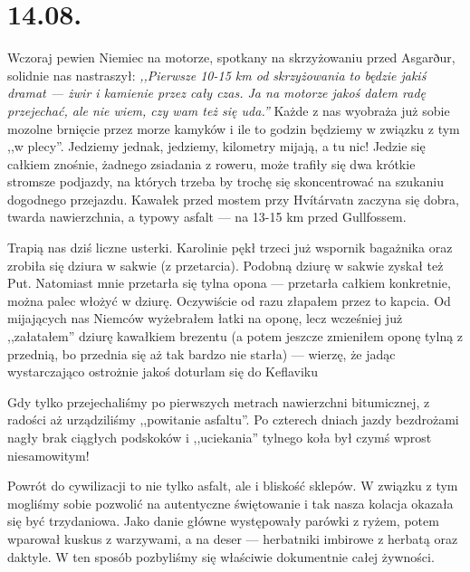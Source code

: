\chapter*{14.08.}

Wczoraj pewien Niemiec na motorze, spotkany na skrzyżowaniu przed Asgarður, solidnie nas nastraszył: \emph{,,Pierwsze 10-15 km od skrzyżowania to będzie jakiś dramat --- żwir i kamienie przez cały czas. Ja na motorze jakoś dałem radę przejechać, ale nie wiem, czy wam też się uda.''} Każde z nas wyobraża już sobie mozolne brnięcie przez morze kamyków i ile to godzin będziemy w związku z tym ,,w plecy''. Jedziemy jednak, jedziemy, kilometry mijają, a tu nic! Jedzie się całkiem znośnie, żadnego zsiadania z roweru, może trafiły się dwa krótkie stromsze podjazdy, na których trzeba by trochę się skoncentrować na szukaniu dogodnego przejazdu. Kawałek przed mostem przy Hvítárvatn zaczyna się dobra, twarda nawierzchnia, a typowy asfalt --- na 13-15 km przed Gullfossem.


Trapią nas dziś liczne usterki. Karolinie pękł trzeci już wspornik bagażnika oraz zrobiła się dziura w sakwie (z przetarcia). Podobną dziurę w sakwie zyskał też Put. Natomiast mnie przetarła się tylna opona --- przetarła całkiem konkretnie, można palec włożyć w dziurę. Oczywiście od razu złapałem przez to kapcia. Od mijających nas Niemców wyżebrałem łatki na oponę, lecz wcześniej już ,,załatałem'' dziurę kawałkiem brezentu (a potem jeszcze zmieniłem oponę tylną z przednią, bo przednia się aż tak bardzo nie starła) --- wierzę, że jadąc wystarczająco ostrożnie jakoś doturlam się do Keflaviku\textellipsis


Gdy tylko przejechaliśmy po pierwszych metrach nawierzchni bitumicznej, z radości aż urządziliśmy ,,powitanie asfaltu''. Po czterech dniach jazdy bezdrożami nagły brak ciągłych podskoków i ,,uciekania'' tylnego koła był czymś wprost niesamowitym!

Powrót do cywilizacji to nie tylko asfalt, ale i bliskość sklepów. W związku z tym mogliśmy sobie pozwolić na autentyczne świętowanie i tak nasza kolacja okazała się być trzydaniowa. Jako danie główne występowały parówki z ryżem, potem wparował kuskus z warzywami, a na deser --- herbatniki imbirowe z herbatą oraz daktyle. W ten sposób pozbyliśmy się właściwie dokumentnie całej żywności.

